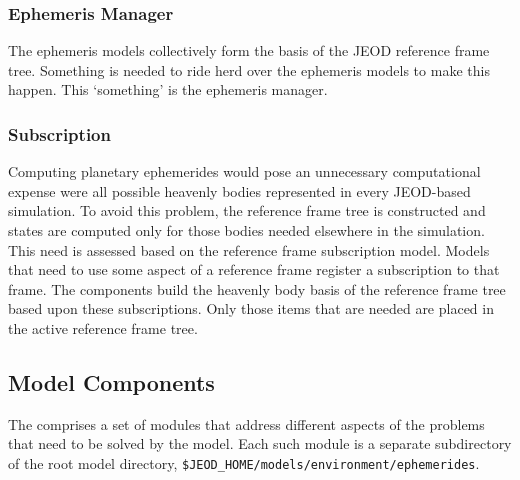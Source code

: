 \subsubsection{Ephemeris Manager}
The ephemeris models collectively form the basis of the JEOD reference
frame tree. Something is needed to ride herd over the ephemeris models
to make this happen. This `something' is the ephemeris manager.

\subsubsection{Subscription}
Computing planetary ephemerides would pose an unnecessary computational expense
were all possible heavenly bodies represented in every JEOD-based simulation.
To avoid this problem, the reference frame tree is constructed and states
are computed only for those bodies needed elsewhere in the simulation.
This need is assessed based on the reference frame subscription model.
Models that need to use some aspect of a reference frame register a
subscription to that frame. The \ModelDesc components build the heavenly
body basis of the reference frame tree based upon these subscriptions.
Only those items that are needed are placed in the active reference frame tree.


\subsection{Model Components}
The \ModelDesc comprises a set of modules that address different aspects of the
problems that need to be solved by the model.
Each such module is a separate subdirectory of the root
model directory, \verb|$JEOD_HOME/models/environment/ephemerides|.
